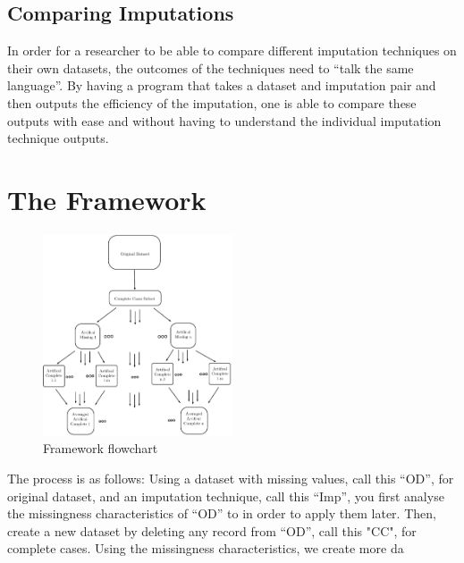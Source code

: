 \documentclass{IEEEconf}
\begin{document}


		\subsection{Comparing Imputations} %
		\label{sub:comparing_imputations}
			In order for a researcher to be able to compare different imputation techniques on their own datasets, the outcomes of the techniques need to ``talk the same language''. By having a program that takes a dataset and imputation pair and then outputs the efficiency of the imputation, one is able to compare these outputs with ease and without having to understand the individual imputation technique outputs. 

	\section{The Framework} %
	\label{sec:the_framework}

		\begin{figure}[!ht]
			\caption{Framework flowchart}
			\centering
			\includegraphics[width=0.5\textwidth]{diagram.pdf}
		\end{figure}
		The process is as follows: Using a dataset with missing values, call this ``OD'', for original dataset, and an imputation technique, call this ``Imp'', you first analyse the missingness characteristics of ``OD'' to in order to apply them later. Then, create a new dataset by deleting any record from ``OD'', call this "CC", for complete cases. Using the missingness characteristics, we create more da
\end{document}
